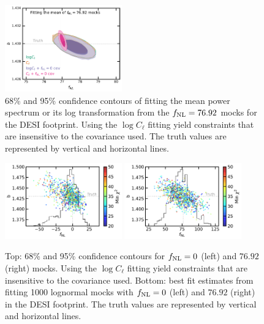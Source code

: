 \begin{figure}
    \centering
    \includegraphics[width=0.45\textwidth]{figures/mcmc_po100.pdf} 
    \caption{68\% and 95\% confidence contours of fitting the mean power spectrum or its log transformation from the $f_{\rm NL}=76.92$ mocks for the DESI footprint. Using the $\log C_{\ell}$ fitting yield constraints that are insensitive to the covariance used. The truth values are represented by vertical and horizontal lines.}\label{fig:mcmc_mocks100}
\end{figure}

\begin{figure}
    \centering
    \includegraphics[width=0.45\textwidth]{figures/bestfit_zero.pdf} 
    \includegraphics[width=0.45\textwidth]{figures/bestfit_po100.pdf}         
    \caption{Top: 68\% and 95\% confidence contours for $f_{\rm NL}=0$ (left) and $76.92$ (right) mocks. Using the $\log C_{\ell}$ fitting yield constraints that are insensitive to the covariance used. Bottom: best fit estimates from fitting 1000 lognormal mocks with $f_{\rm NL}=0$ (left) and $76.92$ (right) in the DESI footprint. The truth values are represented by vertical and horizontal lines.}\label{fig:bestfit_mocks}
\end{figure}




